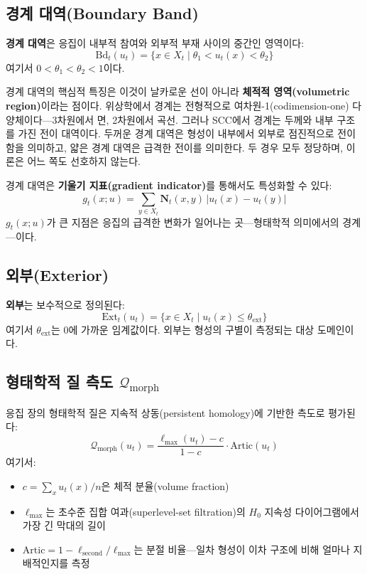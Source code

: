 \subsection{경계 대역(Boundary Band)}

\textbf{경계 대역}은 응집이 내부적 참여와 외부적 부재 사이의 중간인 영역이다:
\begin{equation}
    \mathrm{Bd}_t(u_t) = \{x \in X_t \mid \theta_1 < u_t(x) < \theta_2\}
    \label{eq:boundary-band-def}
\end{equation}
여기서 $0 < \theta_1 < \theta_2 < 1$이다.

경계 대역의 핵심적 특징은 이것이 날카로운 선이 아니라 \textbf{체적적 영역(volumetric region)}이라는 점이다. 위상학에서 경계는 전형적으로 여차원-1(codimension-one) 다양체이다---3차원에서 면, 2차원에서 곡선. 그러나 SCC에서 경계는 두께와 내부 구조를 가진 전이 대역이다. 두꺼운 경계 대역은 형성이 내부에서 외부로 점진적으로 전이함을 의미하고, 얇은 경계 대역은 급격한 전이를 의미한다. 두 경우 모두 정당하며, 이론은 어느 쪽도 선호하지 않는다.

경계 대역은 \textbf{기울기 지표(gradient indicator)}를 통해서도 특성화할 수 있다:
\begin{equation}
    g_t(x; u) = \sum_{y \in X_t} \mathbf{N}_t(x,y) \, |u_t(x) - u_t(y)|
    \label{eq:gradient-indicator}
\end{equation}
$g_t(x; u)$가 큰 지점은 응집의 급격한 변화가 일어나는 곳---형태학적 의미에서의 경계---이다.


\subsection{외부(Exterior)}

\textbf{외부}는 보수적으로 정의된다:
\begin{equation}
    \mathrm{Ext}_t(u_t) = \{x \in X_t \mid u_t(x) \leq \theta_{\mathrm{ext}}\}
    \label{eq:exterior-def}
\end{equation}
여기서 $\theta_{\mathrm{ext}}$는 0에 가까운 임계값이다. 외부는 형성의 구별이 측정되는 대상 도메인이다.


\subsection{형태학적 질 측도 $\mathcal{Q}_{\mathrm{morph}}$}

응집 장의 형태학적 질은 지속적 상동(persistent homology)에 기반한 측도로 평가된다:
\begin{equation}
    \mathcal{Q}_{\mathrm{morph}}(u_t) = \frac{\ell_{\max}(u_t) - c}{1 - c} \cdot \mathrm{Artic}(u_t)
    \label{eq:qmorph-def}
\end{equation}
여기서:
\begin{itemize}
    \item $c = \sum_x u_t(x) / n$은 체적 분율(volume fraction)
    \item $\ell_{\max}$는 초수준 집합 여과(superlevel-set filtration)의 $H_0$ 지속성 다이어그램에서 가장 긴 막대의 길이
    \item $\mathrm{Artic} = 1 - \ell_{\mathrm{second}} / \ell_{\max}$는 분절 비율---일차 형성이 이차 구조에 비해 얼마나 지배적인지를 측정
\end{itemize}

